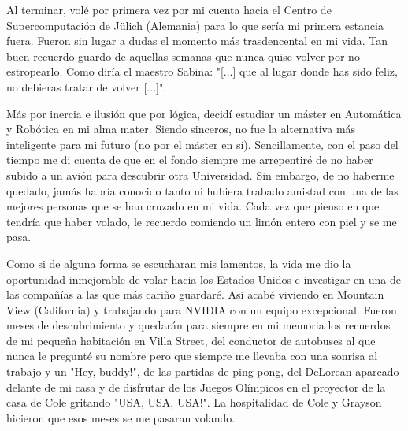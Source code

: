Al terminar, volé por primera vez por mi cuenta hacia el Centro de Supercomputación de Jülich (Alemania) para lo que sería mi primera estancia fuera. Fueron sin lugar a dudas el momento más trasdencental en mi vida. Tan buen recuerdo guardo de aquellas semanas que nunca quise volver por no estropearlo. Como diría el maestro Sabina: "[...] que al lugar donde has sido feliz, no debieras tratar de volver [...]".

Más por inercia e ilusión que por lógica, decidí estudiar un máster en Automática y Robótica en mi alma mater. Siendo sinceros, no fue la alternativa más inteligente para mi futuro (no por el máster en sí). Sencillamente, con el paso del tiempo me di cuenta de que en el fondo siempre me arrepentiré de no haber subido a un avión para descubrir otra Universidad. Sin embargo, de no haberme quedado, jamás habría conocido tanto ni hubiera trabado amistad con una de las mejores personas que se han cruzado en mi vida. Cada vez que pienso en que tendría que haber volado, le recuerdo comiendo un limón entero con piel y se me pasa.

Como si de alguna forma se escucharan mis lamentos, la vida me dio la oportunidad inmejorable de volar hacia los Estados Unidos e investigar en una de las compañías a las que más cariño guardaré. Así acabé viviendo en Mountain View (California) y trabajando para NVIDIA con un equipo excepcional. Fueron meses de descubrimiento y quedarán para siempre en mi memoria los recuerdos de mi pequeña habitación en Villa Street, del conductor de autobuses al que nunca le pregunté su nombre pero que siempre me llevaba con una sonrisa al trabajo y un "Hey, buddy!", de las partidas de ping pong, del DeLorean aparcado delante de mi casa y de disfrutar de los Juegos Olímpicos en el proyector de la casa de Cole gritando "USA, USA, USA!". La hospitalidad de Cole y Grayson hicieron que esos meses se me pasaran volando.

\newpage

